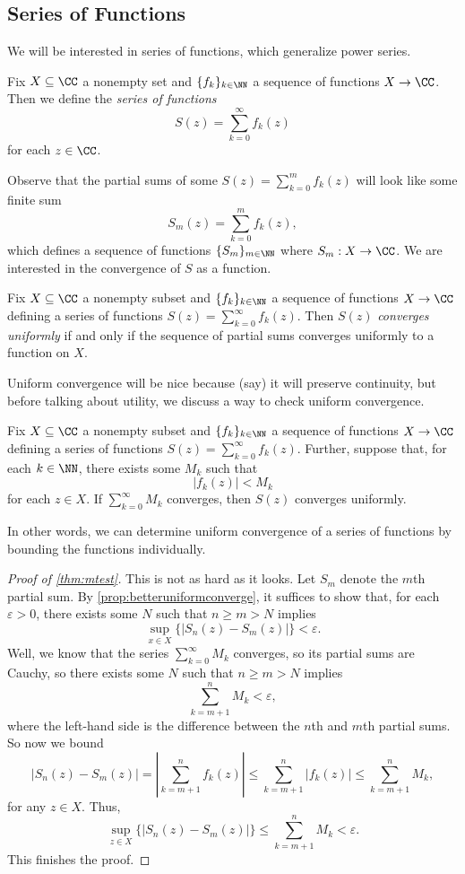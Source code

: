 \subsection{Series of Functions}
We will be interested in series of functions, which generalize power series.
\begin{definition}
	Fix $X\subseteq\CC$ a nonempty set and $\{f_k\}_{k\in\NN}$ a sequence of functions $X\to\CC$. Then we define the \textit{series of functions}
	\[S(z)=\sum_{k=0}^\infty f_k(z)\]
	for each $z\in\CC$.
\end{definition}
Observe that the partial sums of some $S(z)=\sum_{k=0}^mf_k(z)$ will look like some finite sum
\[S_m(z)=\sum_{k=0}^mf_k(z),\]
which defines a sequence of functions $\{S_m\}_{m\in\NN}$ where $S_m:X\to\CC$. We are interested in the convergence of $S$ as a function.
\begin{definition}
	Fix $X\subseteq\CC$ a nonempty subset and $\{f_k\}_{k\in\NN}$ a sequence of functions $X\to\CC$ defining a series of functions $S(z)=\sum_{k=0}^\infty f_k(z)$. Then $S(z)$ \textit{converges uniformly} if and only if the sequence of partial sums converges uniformly to a function on $X$.
\end{definition}
Uniform convergence will be nice because (say) it will preserve continuity, but before talking about utility, we discuss a way to check uniform convergence.
\begin{theorem} \label{thm:mtest}
	Fix $X\subseteq\CC$ a nonempty subset and $\{f_k\}_{k\in\NN}$ a sequence of functions $X\to\CC$ defining a series of functions $S(z)=\sum_{k=0}^\infty f_k(z)$. Further, suppose that, for each $k\in\NN$, there exists some $M_k$ such that
	\[|f_k(z)|<M_k\]
	for each $z\in X$. If $\sum_{k=0}^\infty M_k$ converges, then $S(z)$ converges uniformly.
\end{theorem}
In other words, we can determine uniform convergence of a series of functions by bounding the functions individually.
\begin{proof}[Proof of \autoref{thm:mtest}]
	This is not as hard as it looks. Let $S_m$ denote the $m$th partial sum. By \autoref{prop:betteruniformconverge}, it suffices to show that, for each $\varepsilon>0$, there exists some $N$ such that $n\ge m>N$ implies
	\[\sup_{x\in X}\{|S_n(z)-S_m(z)|\}<\varepsilon.\]
	Well, we know that the series $\sum_{k=0}^\infty M_k$ converges, so its partial sums are Cauchy, so there exists some $N$ such that $n\ge m>N$ implies
	\[\sum_{k=m+1}^nM_k<\varepsilon,\]
	where the left-hand side is the difference between the $n$th and $m$th partial sums. So now we bound
	\[|S_n(z)-S_m(z)|=\left|\sum_{k=m+1}^nf_k(z)\right|\le\sum_{k=m+1}^n|f_k(z)|\le\sum_{k=m+1}^nM_k,\]
	for any $z\in X$. Thus,
	\[\sup_{z\in X}\{|S_n(z)-S_m(z)|\}\le\sum_{k=m+1}^nM_k<\varepsilon.\]
	This finishes the proof.
\end{proof}

